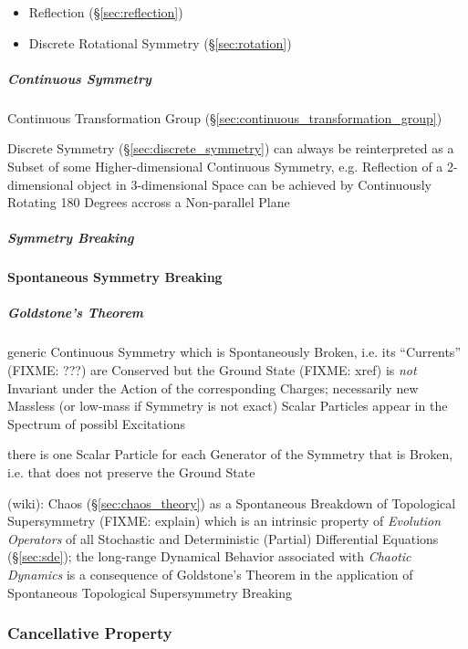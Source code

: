 \begin{itemize}
  \item Reflection (\S\ref{sec:reflection})
  \item Discrete Rotational Symmetry (\S\ref{sec:rotation})
\end{itemize}



\subparagraph{Continuous Symmetry}\label{sec:continuous_symmetry}\hfill

Continuous Transformation Group
(\S\ref{sec:continuous_transformation_group})

Discrete Symmetry (\S\ref{sec:discrete_symmetry}) can always be reinterpreted as
a Subset of some Higher-dimensional Continuous Symmetry, e.g. Reflection of a
2-dimensional object in 3-dimensional Space can be achieved by Continuously
Rotating 180 Degrees accross a Non-parallel Plane



\subparagraph{Symmetry Breaking}\label{sec:symmetry_breaking}\hfill

\textbf{Spontaneous Symmetry Breaking}



\subparagraph{Goldstone's Theorem}\label{sec:goldstones_theorem}\hfill

generic Continuous Symmetry which is Spontaneously Broken, i.e. its ``Currents''
(FIXME: ???) are Conserved but the Ground State (FIXME: xref) is \emph{not}
Invariant under the Action of the corresponding Charges; necessarily new
Massless (or low-mass if Symmetry is not exact) Scalar Particles appear in the
Spectrum of possibl Excitations

there is one Scalar Particle for each Generator of the Symmetry that is Broken,
i.e. that does not preserve the Ground State

(wiki): Chaos (\S\ref{sec:chaos_theory}) as a Spontaneous Breakdown of
Topological Supersymmetry (FIXME: explain) which is an intrinsic property of
\emph{Evolution Operators} of all Stochastic and Deterministic (Partial)
Differential Equations (\S\ref{sec:sde}); the long-range Dynamical Behavior
associated with \emph{Chaotic Dynamics} is a consequence of Goldstone's Theorem
in the application of Spontaneous Topological Supersymmetry Breaking



\subsubsection{Cancellative Property}\label{sec:cancellative_property}

